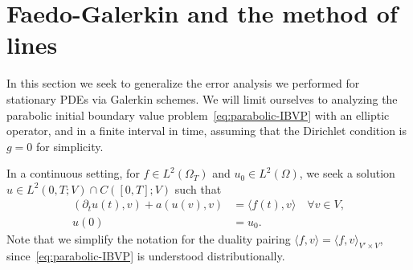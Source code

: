\section{Faedo-Galerkin and the method of lines}\label{sec:faedo-galerkin}
In this section we seek to generalize the error analysis we performed for stationary PDEs via Galerkin schemes. We will limit ourselves to analyzing the parabolic initial boundary value problem~\eqref{eq:parabolic-IBVP} with an elliptic operator, and in a finite interval in time, assuming that the Dirichlet condition is $g=0$ for simplicity.

In a continuous setting, for $f\in L^2(\Omega_T)$ and $u_0\in L^2(\Omega)$, we seek a solution $u\in L^2(0,T;V)\cap C([0,T];V)$ such that 
\begin{equation}\label{eq:weak-form-continuous-parabolic-IBVP}
    \begin{aligned}
        (\partial_t u(t), v) + a(u(v), v) &= \langle f(t), v\rangle\quad \forall v\in V,\\
        u(0) &= u_0.
    \end{aligned}
\end{equation}
Note that we simplify the notation for the duality pairing $\langle f, v\rangle = \langle f, v\rangle_{V'\times V}$, since~\ref{eq:parabolic-IBVP} is understood distributionally. 
